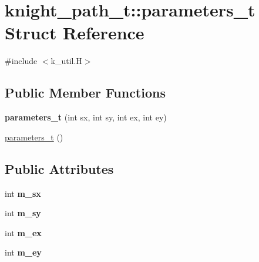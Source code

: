 \hypertarget{structknight__path__t_1_1parameters__t}{\section{knight\-\_\-path\-\_\-t\-:\-:parameters\-\_\-t \-Struct \-Reference}
\label{structknight__path__t_1_1parameters__t}
}


{\ttfamily \#include $<$k\-\_\-util.\-H$>$}

\subsection*{\-Public \-Member \-Functions}
\begin{DoxyCompactItemize}
\item 
\hypertarget{structknight__path__t_1_1parameters__t_acc1d716883a75a7aa2dc020a8d20ba15}{{\bfseries parameters\-\_\-t} (int sx, int sy, int ex, int ey)}\label{structknight__path__t_1_1parameters__t_acc1d716883a75a7aa2dc020a8d20ba15}

\item 
\hyperlink{structknight__path__t_1_1parameters__t_a13247d97673a9958492c0110029d95a3}{parameters\-\_\-t} ()
\end{DoxyCompactItemize}
\subsection*{\-Public \-Attributes}
\begin{DoxyCompactItemize}
\item 
\hypertarget{structknight__path__t_1_1parameters__t_a858187802da01eac78736ce851ac094f}{int {\bfseries m\-\_\-sx}}\label{structknight__path__t_1_1parameters__t_a858187802da01eac78736ce851ac094f}

\item 
\hypertarget{structknight__path__t_1_1parameters__t_a872053ccb5a21788845a276a1b1ee5e5}{int {\bfseries m\-\_\-sy}}\label{structknight__path__t_1_1parameters__t_a872053ccb5a21788845a276a1b1ee5e5}

\item 
\hypertarget{structknight__path__t_1_1parameters__t_a2af73408ef52da6cdc26a98b7929b7e7}{int {\bfseries m\-\_\-ex}}\label{structknight__path__t_1_1parameters__t_a2af73408ef52da6cdc26a98b7929b7e7}

\item 
\hypertarget{structknight__path__t_1_1parameters__t_a19c09303da34faf4692744c6ead1d06f}{int {\bfseries m\-\_\-ey}}\label{structknight__path__t_1_1parameters__t_a19c09303da34faf4692744c6ead1d06f}

\end{DoxyCompactItemize}


